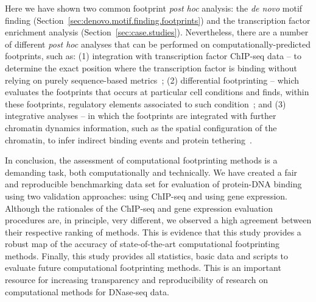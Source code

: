 Here we have shown two common footprint \emph{post hoc} analysis: the \emph{de novo} motif finding (Section~\ref{sec:denovo.motif.finding.footprints}) and the transcription factor enrichment analysis (Section~\ref{sec:case.studies}). Nevertheless, there are a number of different \emph{post hoc} analyses that can be performed on computationally-predicted footprints, such as: (1) integration with transcription factor ChIP-seq data -- to determine the exact position where the transcription factor is binding without relying on purely sequence-based metrics~\cite{pique2011}; (2) differential footprinting -- which evaluates the footprints that occurs at particular cell conditions and finds, within these footprints, regulatory elements associated to such condition~\cite{he2012}; and (3) integrative analyses -- in which the footprints are integrated with further chromatin dynamics information, such as the spatial configuration of the chromatin, to infer indirect binding events and protein tethering~\cite{thurman2012}.

In conclusion, the assessment of computational footprinting methods is a demanding task, both computationally and technically. We have created a fair and reproducible benchmarking data set for evaluation of protein-DNA binding using two validation approaches: using ChIP-seq and using gene expression. Although the rationales of the ChIP-seq and gene expression evaluation procedures are, in principle, very different, we observed a high agreement between their respective ranking of methods. This is evidence that this study provides a robust map of the accuracy of state-of-the-art computational footprinting methods. Finally, this study provides all statistics, basic data and scripts to evaluate future computational footprinting methods. This is an important resource for increasing transparency and reproducibility of research on computational methods for DNase-seq data.


